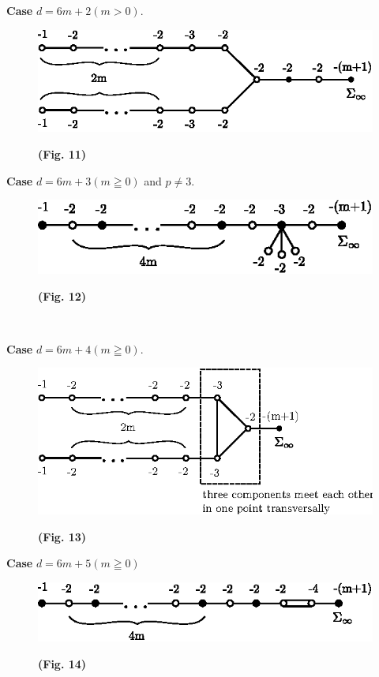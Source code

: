 \medskip
\noindent
{\bf Case} $d=6m+2(m>0)$.
\begin{figure}[H]
\centering
\includegraphics{figures/miyansi_fig12.eps}

\bigskip
\centerline{\bf(Fig. 11)}
\end{figure}
\noindent

\medskip
\noindent
{\bf Case} $d=6m+3(m\geqq 0)$ and $p\neq 3$.
\begin{figure}[H]
\centering
\includegraphics{figures/miyansi_fig12-1.eps}

\bigskip
\centerline{\bf(Fig. 12)}
\end{figure}
\noindent\pageoriginale\

\medskip
\noindent
{\bf Case} $d=6m+4(m\geqq 0)$.
\begin{figure}[H]
\centering
\includegraphics{figures/miyansi_fig13.eps}

\bigskip
\centerline{\bf(Fig. 13)}
\end{figure}
\noindent

\medskip
\noindent
{\bf Case} $d=6m+5(m\geqq 0)$
\begin{figure}[H]
\centering
\includegraphics{figures/miyansi_fig14.eps}

\bigskip
\centerline{\bf(Fig. 14)}
\end{figure}
\noindent

